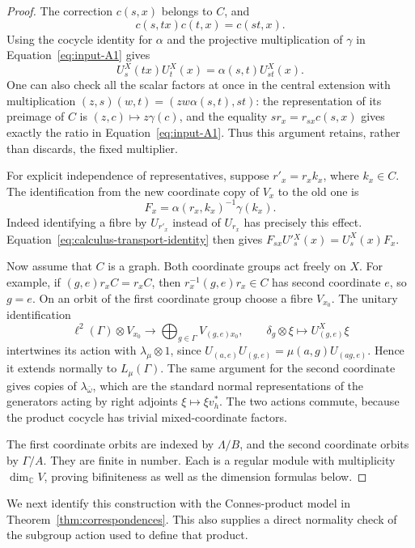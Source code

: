 \begin{proof}
The correction $c(s,x)$ belongs to $C$, and
\[
 c(s,tx)c(t,x)=c(st,x).
\]
Using the cocycle identity for $\alpha$ and the projective multiplication
of $\gamma$ in Equation~\eqref{eq:input-A1} gives
\begin{equation}\label{eq:calculus-transport-identity}
 U^X_s(tx)U^X_t(x)=\alpha(s,t)U^X_{st}(x).
\end{equation}
One can also check all the scalar factors at once in the central
extension with multiplication
$(z,s)(w,t)=(zw\alpha(s,t),st)$: the representation of its preimage
of $C$ is $(z,c)\mapsto z\gamma(c)$, and the equality
$sr_x=r_{sx}c(s,x)$ gives exactly the ratio in
Equation~\eqref{eq:input-A1}.  Thus this argument retains, rather than
discards, the fixed multiplier.

For explicit independence of representatives, suppose
$r'_x=r_xk_x$, where $k_x\in C$.  The identification from the new
coordinate copy of $V_x$ to the old one is
\[
 F_x=\alpha(r_x,k_x)^{-1}\gamma(k_x).
\]
Indeed identifying a fibre by $U_{r'_x}$ instead of $U_{r_x}$ has
precisely this effect.  Equation~\eqref{eq:calculus-transport-identity}
then gives $F_{sx}U'{}^X_s(x)=U^X_s(x)F_x$.

Now assume that $C$ is a graph.  Both coordinate groups act freely on
$X$.  For example, if $(g,e)r_xC=r_xC$, then
$r_x^{-1}(g,e)r_x\in C$ has second coordinate $e$, so $g=e$.
On an orbit of the first coordinate group choose a fibre $V_{x_0}$.
The unitary identification
\[
 \ell^2(\Gamma)\otimes V_{x_0}\longrightarrow
 \bigoplus_{g\in\Gamma}V_{(g,e)x_0},
 \qquad \delta_g\otimes\xi\longmapsto U^X_{(g,e)}\xi
\]
intertwines its action with $\lambda_\mu\otimes1$, since
$U_{(a,e)}U_{(g,e)}=\mu(a,g)U_{(ag,e)}$.  Hence it extends normally
to $L_\mu(\Gamma)$.  The same argument for the second coordinate
gives copies of $\lambda_{\bar\omega}$, which are the standard
normal representations of the generators acting by right adjoints
$\xi\mapsto\xi v_h^*$.  The two actions commute, because the product
cocycle has trivial mixed-coordinate factors.

The first coordinate orbits are indexed by $\Lambda/B$, and the
second coordinate orbits by $\Gamma/A$.  They are finite in number.
Each is a regular module with multiplicity $\dim_{\mathbb C}V$,
proving bifiniteness as well as the dimension formulas below.
\end{proof}

We next identify this construction with the Connes-product model in
Theorem~\ref{thm:correspondences}.  This also supplies a direct normality
check of the subgroup action used to define that product.

